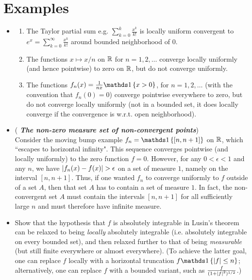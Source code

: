 \documentclass[11pt]{article}
\begin{document}
\section{Examples}
\begin{itemize}
\item \begin{example} \citep{tao2011introduction}
\begin{enumerate}
\item The Taylor partial sum e.g. $\sum_{k=0}^{k}\frac{x^{k}}{k!}$ is locally uniform convergent to $e^{x}= \sum_{k=0}^{\infty}\frac{x^{k}}{k!}$ around bounded neighborhood of $0$.

\item The functions $x \mapsto x/n$ on ${\mathbb R}$ for $n = 1, 2, \ldots$ converge locally uniformly (and hence pointwise) to zero on ${\mathbb R}$, but do not converge uniformly.

\item The functions $f_n(x) = \frac{1}{nx}\ind{x>0}$, for $n = 1,2,\ldots$ (with the convention that $f_n(0) = 0$) converge pointwise everywhere to zero, but do not converge locally uniformly (not in a bounded set, it does locally converge if the convergence is w.r.t. open neighborhood).
\end{enumerate}
\end{example} 


\item \begin{example}  (\emph{\citep{tao2011introduction} \textbf{The non-zero measure set of non-convergent points}})\\
Consider the moving bump example $f_n = \ind{[n,n+1]}$ on ${\mathbb R}$, which ``escapes to horizontal infinity". This sequence converges pointwise (and locally uniformly) to the zero function $f = 0$. However, for any $0 < \epsilon < 1$ and any $n$, we have $\left\lvert f_n(x)- f(x) \right\rvert > \epsilon$ on a set of measure $1$, namely on the interval $[n, n + 1]$. Thus, if one wanted
$f_n$ to converge uniformly to $f$ outside of a set $A$, then that set $A$ has to contain a set of measure $1$. In fact, the non-convergent set $A$ must contain the intervals $[n, n + 1]$ for all sufficiently large $n$ and must therefore have infinite measure.
\end{example}


\item \begin{exercise} \citep{tao2011introduction}
Show that the hypothesis that $f$ is absolutely integrable in Lusin's theorem can be relaxed to being \emph{locally} absolutely integrable (i.e. absolutely integrable on every bounded set), and then relaxed further to that of being \emph{measurable} (but still finite everywhere or almost everywhere). (To achieve the latter goal, one can replace $f$ locally with a horizontal truncation $f\ind{\abs{f}\le n}$; alternatively, one can replace $f$ with a bounded variant, such as $\frac{f}{(1+\left\lvert f \right\rvert^2)^{1/2}}$.)
\end{exercise}



\end{itemize}
\end{document}
